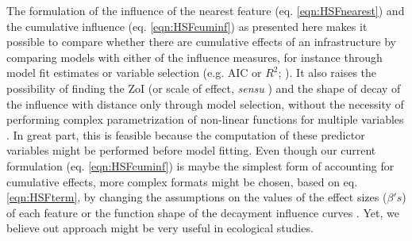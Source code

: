 \documentclass[titlepage]{article}
\begin{document}
The formulation of the influence of the nearest feature (eq. \ref{eqn:HSFnearest}) and the cumulative influence (eq. \ref{eqn:HSFcuminf}) as presented here makes it possible to compare whether there are cumulative effects of an infrastructure by comparing models with either of the influence measures, for instance through model fit estimates or variable selection (e.g. AIC or $R^2$; \citealt{jackson_are_2015, huais_multifit_2018}). It also raises the possibility of finding the ZoI (or scale of effect, \textit{sensu} \citealt{jackson_are_2015}) and the shape of decay of the influence with distance \citep[e.g. threshold or exponential decay, as in ][]{miguet_how_2017} only through model selection, without the necessity of performing complex parametrization of non-linear functions for multiple variables \citep{lee_estimating_2020}. In great part, this is feasible because the computation of these predictor variables might be performed before model fitting. 
Even though our current formulation (eq. \ref{eqn:HSFcuminf}) is maybe the simplest form of accounting for cumulative effects, more complex formats might be chosen, based on eq. \ref{eqn:HSFterm}, by changing the assumptions on the values of the effect sizes ($\beta's$) of each feature or the function shape of the decayment influence curves \citep{miguet_how_2017}. Yet, we believe out approach might be very useful in ecological studies.
\end{document}
